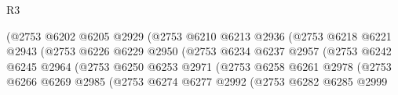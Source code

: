 \begin{lexlean}{R3}
\begin{coremodule}
                                          (@2753
                                            @6202
                                            @6205
                                            @2929
                                            (@2753
                                              @6210
                                              @6213
                                              @2936
                                              (@2753
                                                @6218
                                                @6221
                                                @2943
                                                (@2753
                                                  @6226
                                                  @6229
                                                  @2950
                                                  (@2753
                                                    @6234
                                                    @6237
                                                    @2957
                                                    (@2753
                                                      @6242
                                                      @6245
                                                      @2964
                                                      (@2753
                                                        @6250
                                                        @6253
                                                        @2971
                                                        (@2753
                                                          @6258
                                                          @6261
                                                          @2978
                                                          (@2753
                                                            @6266
                                                            @6269
                                                            @2985
                                                            (@2753
                                                              @6274
                                                              @6277
                                                              @2992
                                                              (@2753
                                                                @6282
                                                                @6285
                                                                @2999

\end{coremodule}
\end{lexlean}
